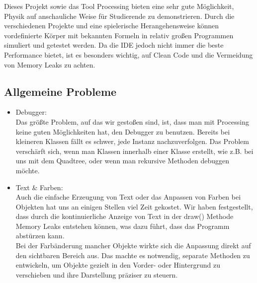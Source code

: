 \documentclass[12pt,a4paper]{article}
\begin{document}
Dieses Projekt sowie das Tool Processing bieten eine sehr gute Möglichkeit, Physik auf anschauliche Weise für Studierende zu demonstrieren. Durch die verschiedenen Projekte und eine spielerische Herangehensweise können vordefinierte Körper mit bekannten Formeln in relativ großen Programmen simuliert und getestet werden. Da die IDE jedoch nicht immer die beste Performance bietet, ist es besonders wichtig, auf Clean Code und die Vermeidung von Memory Leaks zu achten.

\subsection{Allgemeine Probleme}
\begin{itemize}
	\item Debugger: \\
	Das größte Problem, auf das wir gestoßen sind, ist, dass man mit Processing keine guten Möglichkeiten hat, den Debugger zu benutzen. Bereits bei kleineren Klassen fällt es schwer, jede Instanz nachzuverfolgen. Das Problem verschärft sich, wenn man Klassen innerhalb einer Klasse erstellt, wie z.B. bei uns mit dem Quadtree, oder wenn man rekursive Methoden debuggen möchte.
	\item Text \& Farben:\\
	Auch die einfache Erzeugung von Text oder das Anpassen von Farben bei Objekten hat uns an einigen Stellen viel Zeit gekostet. Wir haben festgestellt, dass durch die kontinuierliche Anzeige von Text in der draw() Methode Memory Leaks entstehen können, was dazu führt, dass das Programm abstürzen kann.\\
	Bei der Farbänderung mancher Objekte wirkte sich die Anpassung direkt auf den sichtbaren Bereich aus. Das machte es notwendig, separate Methoden zu entwickeln, um Objekte gezielt in den Vorder- oder Hintergrund zu verschieben und ihre Darstellung präziser zu steuern.
	
	
	
\end{itemize}





	
	
	
	
\end{document}
